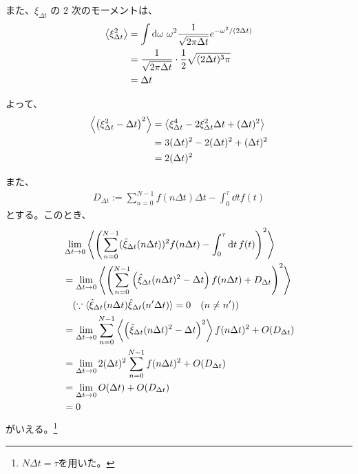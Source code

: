 \documentclass[a4paper,11pt]{jsarticle}
\numberwithin{equation}{section}
\begin{document}
また、$\xi_{\Delta t}$ の 2 次のモーメントは、
\begin{align}
\left\langle \xi_{\Delta t}^2 \right\rangle 
&= \int \dd{\omega} \, \omega^2 \frac{1}{\sqrt{2\pi \Delta t}} e^{-\omega^2/(2\Delta t)} \notag \\
&= \frac{1}{\sqrt{2\pi \Delta t}} \cdot \frac{1}{2} \sqrt{(2\Delta t)^3 \pi} \notag \\
&= \Delta t
\end{align}

よって、
\begin{align}
\left\langle \left( \xi_{\Delta t}^2 - \Delta t \right)^2 \right\rangle 
&= \left\langle \xi_{\Delta t}^4 - 2\xi_{\Delta t}^2 \Delta t + (\Delta t)^2 \right\rangle \notag \\
&= 3 (\Delta t)^2 - 2 (\Delta t)^2 + (\Delta t)^2 \notag \\
&= 2 (\Delta t)^2
\end{align}

また、
\begin{align}
  D_{\Delta t} := \sum_{n=0}^{N-1} f(n \Delta t) \Delta t - \int_0^{\tau} \dd{t} f(t) \label{eq:D_delta}
\end{align}
とする。このとき、
\begin{align}
&\lim_{\Delta t \to 0} 
\left\langle 
\left( 
\sum_{n=0}^{N-1} (\hat{\xi}_{\Delta t}(n\Delta t))^2 f(n\Delta t) 
- \int_0^{\tau} \dd{t} f(t) 
\right)^2 
\right\rangle
\\
&= \lim_{\Delta t \to 0} 
\left\langle 
\left( 
\sum_{n=0}^{N-1} \left( \hat{\xi}_{\Delta t}(n\Delta t)^2 - \Delta t \right) f(n\Delta t) + D_{\Delta t}
\right)^2 
\right\rangle \notag \\
&\quad (\because \langle \hat{\xi}_{\Delta t}(n\Delta t) \hat{\xi}_{\Delta t}(n'\Delta t) \rangle = 0 \quad (n \ne n')) \notag \\
&= \lim_{\Delta t \to 0} 
\sum_{n=0}^{N-1} 
\left\langle 
\left( \hat{\xi}_{\Delta t}(n\Delta t)^2 - \Delta t \right)^2 
\right\rangle 
f(n\Delta t)^2 + O(D_{\Delta t}) \notag \\
&= \lim_{\Delta t \to 0} 
2 (\Delta t)^2 \sum_{n=0}^{N-1} f(n\Delta t)^2 + O(D_{\Delta t}) \notag \\
&= \lim_{\Delta t \to 0} 
O(\Delta t) + O(D_{\Delta t}) \notag \\
&= 0
\end{align}
がいえる。\footnote{
  $N\Delta t = \tau$を用いた。
}
\end{document}
